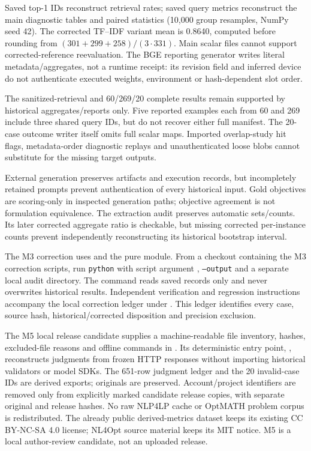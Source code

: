 Saved top-1 IDs reconstruct retrieval rates; saved query metrics reconstruct the main diagnostic tables and paired statistics (10,000 group resamples, NumPy seed 42). The corrected TF--IDF variant mean is 0.8640, computed before rounding from $(301+299+258)/(3\cdot331)$. Main scalar files cannot support corrected-reference reevaluation. The BGE reporting generator writes literal metadata/aggregates, not a runtime receipt: its revision field and inferred device do not authenticate executed weights, environment or hash-dependent slot order.

The sanitized-retrieval and 60/269/20 complete results remain supported by historical aggregates/reports only. Five reported examples each from 60 and 269 include three shared query IDs, but do not recover either full manifest. The 20-case outcome writer itself omits full scalar maps. Imported overlap-study hit flags, metadata-order diagnostic replays and unauthenticated loose blobs cannot substitute for the missing target outputs.

External generation preserves artifacts and execution records, but incompletely retained prompts prevent authentication of every historical input. Gold objectives are scoring-only in inspected generation paths; objective agreement is not formulation equivalence. The extraction audit preserves automatic sets/counts. Its later corrected aggregate ratio is checkable, but missing corrected per-instance counts prevent independently reconstructing its historical bootstrap interval.

The M3 correction uses  and the pure  module. From a checkout containing the M3 correction scripts, run \texttt{python} with script argument , \texttt{--output} and a separate local audit directory. The command reads saved records only and never overwrites historical results. Independent verification and regression instructions accompany the local correction ledger under . This ledger identifies every case, source hash, historical/corrected disposition and precision exclusion.

The M5 local release candidate supplies a machine-readable file inventory, hashes, excluded-file reasons and offline commands in . Its deterministic entry point, , reconstructs judgments from frozen HTTP responses without importing historical validators or model SDKs. The 651-row judgment ledger and the 20 invalid-case IDs are derived exports; originals are preserved. Account/project identifiers are removed only from explicitly marked candidate release copies, with separate original and release hashes. No raw NLP4LP cache or OptMATH problem corpus is redistributed. The already public derived-metrics dataset keeps its existing CC BY-NC-SA 4.0 license; NL4Opt source material keeps its MIT notice. M5 is a local author-review candidate, not an uploaded release.

